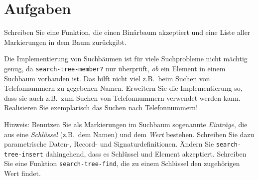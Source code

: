 \section*{Aufgaben}

\begin{aufgabe}
  Schreiben Sie eine Funktion, die einen Binärbaum akzeptiert
  und eine Liste aller Markierungen in dem Baum zurückgibt.
\end{aufgabe}


\begin{aufgabe}
  Die Implementierung von Suchbäumen ist für viele Suchprobleme nicht
  mächtig genug, da \texttt{search-tree-member?} nur überprüft,
  \emph{ob} ein Element in einem Suchbaum vorhanden ist.  Das hilft
  nicht viel z.B.\ beim Suchen von Telefonnummern zu gegebenen Namen.
  Erweitern Sie die Implementierung so, dass sie auch z.B.\ zum Suchen
  von Telefonnummern verwendet werden kann.  Realisieren Sie
  exemplarisch das Suchen nach Telefonnummern!

  Hinweis: Benutzen Sie als Markierungen im Suchbaum sogenannte
  \textit{Einträge}, die aus eine \textit{Schlüssel} (z.B.\ dem Namen)
  und dem \textit{Wert} bestehen.  Schreiben Sie dazu parametrische Daten-,
  Record- und Signaturdefinitionen. Ändern Sie \texttt{search-tree-insert}
  dahingehend, dass es Schlüssel und Element akzeptiert.  Schreiben Sie eine
  Funktion \texttt{search-tree-find}, die zu einem Schlüssel den
  zugehörigen Wert findet.
\end{aufgabe}

